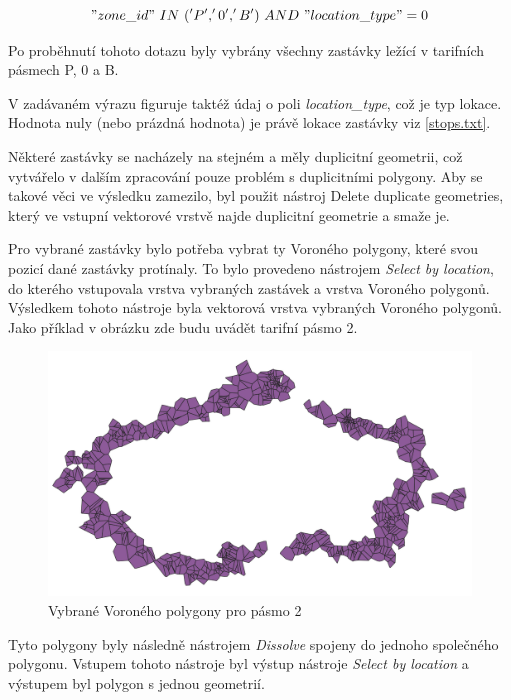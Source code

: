 \["zone\_id"\ IN\ ('P','0','B')\ AND\ "location\_type" = 0\]

Po proběhnutí tohoto dotazu byly vybrány všechny zastávky ležící v tarifních pásmech P, 0 a B. 

V zadávaném výrazu figuruje taktéž údaj o poli \textit{location\_type}, což je typ lokace. 
Hodnota nuly (nebo prázdná hodnota) je právě lokace zastávky viz \ref{stops.txt}.

Některé zastávky se nacházely na stejném a měly duplicitní geometrii, což vytvářelo v dalším
zpracování pouze problém s duplicitními polygony. Aby se takové věci ve výsledku zamezilo, byl použit nástroj   
Delete duplicate geometries, který ve vstupní vektorové vrstvě najde duplicitní geometrie a smaže je.

Pro vybrané zastávky bylo potřeba vybrat ty Voroného polygony, které svou
pozicí dané zastávky protínaly. To bylo provedeno nástrojem \textit{Select by location},
do kterého vstupovala vrstva vybraných zastávek a vrstva Voroného polygonů. Výsledkem tohoto nástroje byla
vektorová vrstva vybraných Voroného polygonů. Jako příklad v obrázku zde budu uvádět tarifní pásmo 2.

\begin{figure}[H] \centering
    \includegraphics[width=400pt]{./pictures/voronoi-selected.png}
    \caption[Vybrané Voroného polygony pro pásmo 2]{Vybrané Voroného polygony pro pásmo 2}
	\label{fig:voronoi-selected}              
\end{figure}

Tyto polygony byly následně nástrojem \textit{Dissolve} spojeny do jednoho společného polygonu.
Vstupem tohoto nástroje byl výstup nástroje \textit{Select by location} a výstupem byl polygon
s jednou geometrií. 

